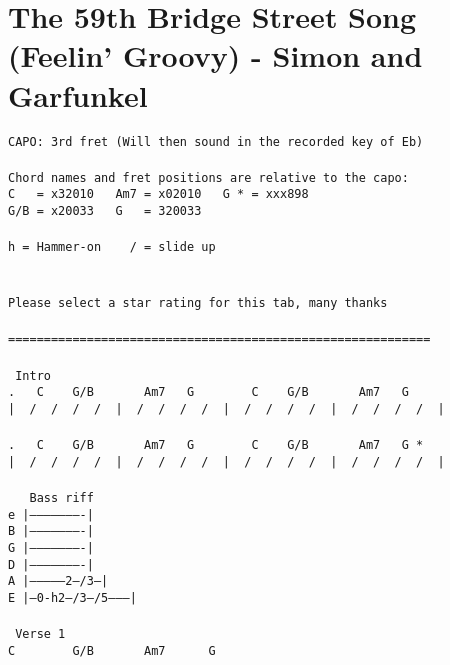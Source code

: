 \newpage
\section{The 59th Bridge Street Song (Feelin' Groovy) - Simon and Garfunkel}
\label{The 59th Bridge Street Song (Feelin' Groovy) - Simon and Garfunkel}
\texttt{CAPO:\ 3rd\ fret\ (Will\ then\ sound\ in\ the\ recorded\ key\ of\ Eb)\\
\\
Chord\ names\ and\ fret\ positions\ are\ relative\ to\ the\ capo:\\
C\ \ \ =\ x32010\ \ \ Am7\ =\ x02010\ \ \ G\ *\ =\ xxx898\\
G/B\ =\ x20033\ \ \ G\ \ \ =\ 320033\\
\\
h\ =\ Hammer-on\ \ \ \ /\ =\ slide\ up\\
\\
\\
Please\ select\ a\ star\ rating\ for\ this\ tab,\ many\ thanks\\
\\
===========================================================\\
\\
\lbrack\ Intro\rbrack\\
.\ \ \ C\ \ \ \ G/B\ \ \ \ \ \ \ Am7\ \ \ G\ \ \ \ \ \ \ \ C\ \ \ \ G/B\ \ \ \ \ \ \ Am7\ \ \ G\ \\
|\ \ /\ \ /\ \ /\ \ /\ \ |\ \ /\ \ /\ \ /\ \ /\ \ |\ \ /\ \ /\ \ /\ \ /\ \ |\ \ /\ \ /\ \ /\ \ /\ \ |\\
\\
.\ \ \ C\ \ \ \ G/B\ \ \ \ \ \ \ Am7\ \ \ G\ \ \ \ \ \ \ \ C\ \ \ \ G/B\ \ \ \ \ \ \ Am7\ \ \ G\ *\\
|\ \ /\ \ /\ \ /\ \ /\ \ |\ \ /\ \ /\ \ /\ \ /\ \ |\ \ /\ \ /\ \ /\ \ /\ \ |\ \ /\ \ /\ \ /\ \ /\ \ |\\
\\
\ \ \lbrack\ Bass\ riff\rbrack\\
e\ |----------------------|\\
B\ |----------------------|\\
G\ |----------------------|\\
D\ |----------------------|\\
A\ |---------------2--/3--|\\
E\ |--0-h2--/3--/5--------|\\
\\
\lbrack\ Verse\ 1\rbrack\\
C\ \ \ \ \ \ \ \ G/B\ \ \ \ \ \ \ Am7\ \ \ \ \ \ G\\
}
